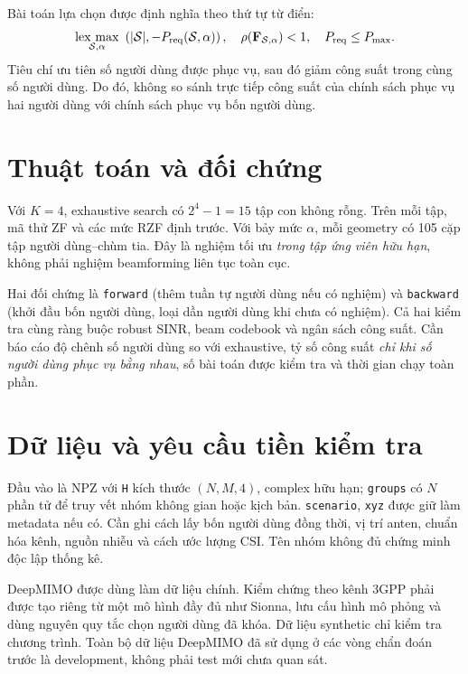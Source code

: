 \documentclass[12pt,onecolumn]{IEEEtran}
\begin{document}
Bài toán lựa chọn được định nghĩa theo thứ tự từ điển:
\begin{equation}
\underset{\mathcal S,\alpha}{\operatorname{lex\ max}}\ \left(|\mathcal S|,-P_{\rm req}(\mathcal S,\alpha)\right),\quad
\rho(\mathbf F_{\mathcal S,\alpha})<1,\quad P_{\rm req}\le P_{\max}.
\end{equation}
Tiêu chí ưu tiên số người dùng được phục vụ, sau đó giảm công suất trong cùng số người dùng. Do đó, không so sánh trực tiếp công suất của chính sách phục vụ hai người dùng với chính sách phục vụ bốn người dùng.

\section{Thuật toán và đối chứng}
Với $K=4$, exhaustive search có $2^4-1=15$ tập con không rỗng. Trên mỗi tập, mã thử ZF và các mức RZF định trước. Với bảy mức $\alpha$, mỗi geometry có 105 cặp tập người dùng–chùm tia. Đây là nghiệm tối ưu \emph{trong tập ứng viên hữu hạn}, không phải nghiệm beamforming liên tục toàn cục.

Hai đối chứng là \texttt{forward} (thêm tuần tự người dùng nếu có nghiệm) và \texttt{backward} (khởi đầu bốn người dùng, loại dần người dùng khi chưa có nghiệm). Cả hai kiểm tra cùng ràng buộc robust SINR, beam codebook và ngân sách công suất. Cần báo cáo độ chênh số người dùng so với exhaustive, tỷ số công suất \emph{chỉ khi số người dùng phục vụ bằng nhau}, số bài toán được kiểm tra và thời gian chạy toàn phần.

\section{Dữ liệu và yêu cầu tiền kiểm tra}
Đầu vào là NPZ với \texttt{H} kích thước $(N,M,4)$, complex hữu hạn; \texttt{groups} có $N$ phần tử để truy vết nhóm không gian hoặc kịch bản. \texttt{scenario}, \texttt{xyz} được giữ làm metadata nếu có. Cần ghi cách lấy bốn người dùng đồng thời, vị trí anten, chuẩn hóa kênh, nguồn nhiễu và cách ước lượng CSI. Tên nhóm không đủ chứng minh độc lập thống kê.

DeepMIMO được dùng làm dữ liệu chính. Kiểm chứng theo kênh 3GPP phải được tạo riêng từ một mô hình đầy đủ như Sionna, lưu cấu hình mô phỏng và dùng nguyên quy tắc chọn người dùng đã khóa. Dữ liệu synthetic chỉ kiểm tra chương trình. Toàn bộ dữ liệu DeepMIMO đã sử dụng ở các vòng chẩn đoán trước là development, không phải test mới chưa quan sát.
\end{document}
